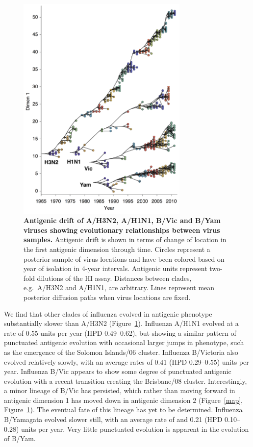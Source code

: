 \documentclass[11pt,oneside,letterpaper]{article}
\begin{document}
\begin{figure}[h]
	\centering		
	\includegraphics[width=0.75\textwidth]{figures/drift}
	\caption{\textbf{Antigenic drift of A/H3N2, A/H1N1, B/Vic and B/Yam viruses showing evolutionary relationships between virus samples.} 
	Antigenic drift is shown in terms of change of location in the first antigenic dimension through time.
	Circles represent a posterior sample of virus locations and have been colored based on year of isolation in 4-year intervals.
	Antigenic units represent two-fold dilutions of the HI assay.
	Distances between clades, e.g.\ A/H3N2 and A/H1N1, are arbitrary.
	Lines represent mean posterior diffusion paths when virus locations are fixed.} 
	\label{drift} 
\end{figure}

We find that other clades of influenza evolved in antigenic phenotype substantially slower than A/H3N2 (Figure~\ref{drift}).
Influenza A/H1N1 evolved at a rate of 0.55 units per year (HPD 0.49--0.62), but showing a similar pattern of punctuated antigenic evolution with occasional larger jumps in phenotype, such as the emergence of the Solomon Islands/06 cluster.  
Influenza B/Victoria also evolved relatively slowly, with an average rates of 0.41 (HPD 0.29--0.55) units per year.
Influenza B/Vic appears to show some degree of punctuated antigenic evolution with a recent transition creating the Brisbane/08 cluster.
Interestingly, a minor lineage of B/Vic has persisted, which rather than moving forward in antigenic dimension 1 has moved down in antigenic dimension 2 (Figure~\ref{map}, Figure~\ref{drift}).
The eventual fate of this lineage has yet to be determined.
Influenza B/Yamagata evolved slower still, with an average rate of and 0.21 (HPD 0.10--0.28) units per year.
Very little punctuated evolution is apparent in the evolution of B/Yam.
\end{document}
